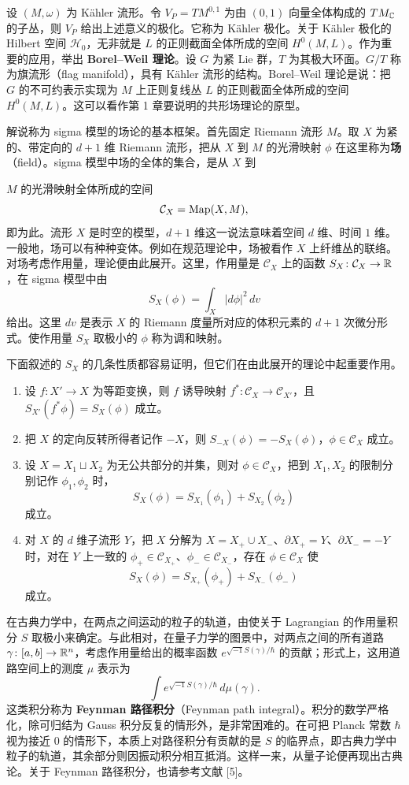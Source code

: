 设 $(M,\omega)$ 为 Kähler 流形。令 $V_P=TM^{0,1}$ 为由 $(0,1)$ 向量全体构成的 $TM_{\mathbb{C}}$ 的子丛，则 $V_P$ 给出上述意义的极化。它称为 Kähler 极化。关于 Kähler 极化的 Hilbert 空间 $\mathcal{H}_0$，无非就是 $L$ 的正则截面全体所成的空间 $H^{0}(M,L)$。作为重要的应用，举出 \textbf{Borel--Weil 理论}。设 $G$ 为紧 Lie 群，$T$ 为其极大环面。$G/T$ 称为旗流形（flag manifold），具有 Kähler 流形的结构。Borel--Weil 理论是说：把 $G$ 的不可约表示实现为 $M$ 上正则复线丛 $L$ 的正则截面全体所成的空间 $H^{0}(M,L)$。这可以看作第 1 章要说明的共形场理论的原型。

解说称为 sigma 模型的场论的基本框架。首先固定 Riemann 流形 $M$。取 $X$ 为紧的、带定向的 $d+1$ 维 Riemann 流形，把从 $X$ 到 $M$ 的光滑映射 $\phi$ 在这里称为\textbf{场}（field）。sigma 模型中场的全体的集合，是从 $X$ 到

$M$ 的光滑映射全体所成的空间
\[
  \mathcal{C}_X=\operatorname{Map}(X,M),
\]
即为此。流形 $X$ 是时空的模型，$d+1$ 维这一说法意味着空间 $d$ 维、时间 $1$ 维。一般地，场可以有种种变体。例如在规范理论中，场被看作 $X$ 上纤维丛的联络。对场考虑作用量，理论便由此展开。这里，作用量是 $\mathcal{C}_X$ 上的函数 $S_X\colon\mathcal{C}_X\to\mathbb{R}$，在 sigma 模型中由
\[
  S_X(\phi)=\int_X |d\phi|^{2}\,dv
\]
给出。这里 $dv$ 是表示 $X$ 的 Riemann 度量所对应的体积元素的 $d+1$ 次微分形式。使作用量 $S_X$ 取极小的 $\phi$ 称为调和映射。

下面叙述的 $S_X$ 的几条性质都容易证明，但它们在由此展开的理论中起重要作用。
\begin{enumerate}[label=(\arabic*),leftmargin=2.2em,itemsep=2pt]
\item 设 $f\colon X'\to X$ 为等距变换，则 $f$ 诱导映射 $f^{*}\colon\mathcal{C}_X\to\mathcal{C}_{X'}$，且 $S_{X'}(f^{*}\phi)=S_X(\phi)$ 成立。
\item 把 $X$ 的定向反转所得者记作 $-X$，则 $S_{-X}(\phi)=-S_X(\phi)$，$\phi\in\mathcal{C}_X$ 成立。
\item 设 $X=X_1\sqcup X_2$ 为无公共部分的并集，则对 $\phi\in\mathcal{C}_X$，把到 $X_1,X_2$ 的限制分别记作 $\phi_1,\phi_2$ 时，
\[
  S_X(\phi)=S_{X_1}(\phi_1)+S_{X_2}(\phi_2)
\]
成立。
\item 对 $X$ 的 $d$ 维子流形 $Y$，把 $X$ 分解为 $X=X_+\cup X_-$、$\partial X_+=Y$、$\partial X_-=-Y$ 时，对在 $Y$ 上一致的 $\phi_+\in\mathcal{C}_{X_+}$、$\phi_-\in\mathcal{C}_{X_-}$，存在 $\phi\in\mathcal{C}_X$ 使
\[
  S_X(\phi)=S_{X_+}(\phi_+)+S_{X_-}(\phi_-)
\]
成立。
\end{enumerate}

在古典力学中，在两点之间运动的粒子的轨道，由使关于 Lagrangian 的作用量积分 $S$ 取极小来确定。与此相对，在量子力学的图景中，对两点之间的所有道路 $\gamma\colon[a,b]\to\mathbb{R}^{n}$，考虑作用量给出的概率函数 $e^{\sqrt{-1}S(\gamma)/\hbar}$ 的贡献；形式上，这用道路空间上的测度 $\mu$ 表示为
\[
  \int e^{\sqrt{-1}S(\gamma)/\hbar}\,d\mu(\gamma).
\]
这类积分称为 \textbf{Feynman 路径积分}（Feynman path integral）。积分的数学严格化，除可归结为 Gauss 积分反复的情形外，是非常困难的。在可把 Planck 常数 $\hbar$ 视为接近 $0$ 的情形下，本质上对路径积分有贡献的是 $S$ 的临界点，即古典力学中粒子的轨道，其余部分则因振动积分相互抵消。这样一来，从量子论便再现出古典论。关于 Feynman 路径积分，也请参考文献 [5]。

